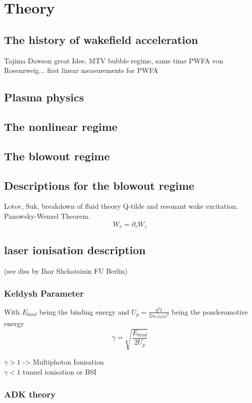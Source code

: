 \chapter{Theory}
\section{The history of wakefield acceleration}
Tajima Dawson great Idee, MTV bubble regime, same time PWFA von Rosenzweig... first linear measurements for PWFA
\section{Plasma physics}
\section{The nonlinear regime}

\section{The blowout regime}
\section{Descriptions for the blowout regime}
Lotov, Suk, breakdown of fluid theory
Q-tilde and resonant wake excitation.\\
Panowsky-Wenzel Theorem. \begin{equation}
W_r =\partial_r W_z
\end{equation} 
\section{laser ionisation description}
(see diss by Ihar Shchatsinin FU Berlin)
\subsection{Keldysh Parameter}

With $E_{bind}$ being the binding energy and $U_p=\frac{q^2 I}{2 m_e \epsilon_0 c \omega^2}$ being the ponderomotive energy 
\begin{equation}
\gamma=\sqrt{\frac{E_{bind}}{2U_p}}
\end{equation}

$\gamma >1 $ -> Multiphoton Ionisation\\
$\gamma < 1$ tunnel ionisation or BSI

\subsection{ADK theory}

